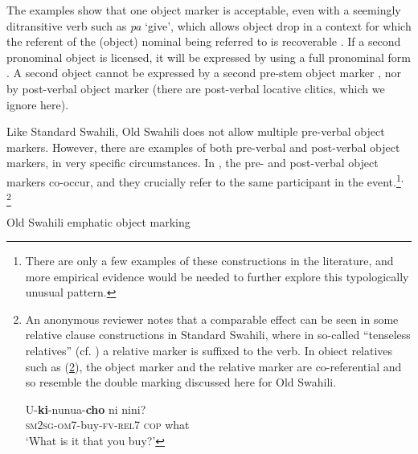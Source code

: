 \documentclass[output=paper]{langscibook}
\begin{document}

    \z
\z

The examples show that one object marker is acceptable, even with a seemingly ditransitive verb such as \textit{{}pa} ‘give’, which allows object drop in a context for which the referent of the (object) nominal being referred to is recoverable . If a second pronominal object is licensed, it will be expressed by using a full pronominal form . A second object cannot be expressed by a second pre-stem object marker , nor by post-verbal object marker  (there are post-verbal locative clitics, which we ignore here).  

  Like Standard Swahili, Old Swahili does not allow multiple pre-verbal object markers. However, there are examples of both pre-verbal and post-verbal object markers, in very specific circumstances. In , the pre- and post-verbal object markers co-occur, and they crucially refer to the same participant in the event.\footnote{There are only a few examples of these constructions in the literature, and more empirical evidence would be needed to further explore this typologically unusual pattern.}\textsuperscript{,} \footnote{An anonymous reviewer notes that a comparable effect can be seen in some relative clause constructions in Standard Swahili, where in so-called ``tenseless relatives'' (cf. \citealt{Schadeberg1989}) a relative marker is suffixed to the verb. In obiect relatives such as (\ref{ex:marten:15i}), the object marker and the relative marker are co-referential and so resemble the double marking discussed here for Old Swahili.
  
  \ea\label{ex:marten:15i} \gll U-\textbf{ki}{}-nunua-\textbf{cho}          ni     nini?\\
  \textsc{sm2sg-om7}-buy-\textsc{fv-rel7} \textsc{cop} what \\
  \glt ‘What is it that you buy?’
  \z} 

\ea\label{ex:marten:45}Old Swahili emphatic object marking
\end{document}
